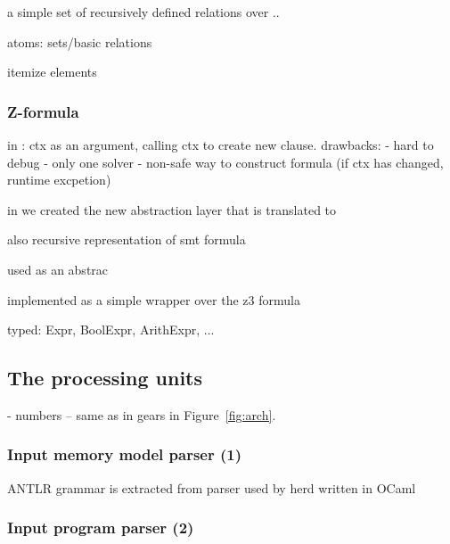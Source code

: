 a simple set of recursively defined relations over ..

atoms: sets/basic relations

itemize elements


\subsubsection{Z-formula}
\label{ch:impl:model:zformula}


in \porthos[1] : ctx as an argument, calling ctx to create new clause. 
drawbacks:
- hard to debug
- only one solver
- non-safe way to construct formula (if ctx has changed, runtime excpetion)

in \porthos[2] we created the new abstraction layer \zformula that is translated to 

also recursive representation of smt formula

used as an abstrac

implemented as a simple wrapper over the z3 formula

typed: Expr, BoolExpr, ArithExpr, ...


\subsection{The processing units} %
\label{ch:impl:proc}


- numbers -- same as in gears in Figure~\ref{fig:arch}.

\subsubsection{Input memory model parser (1)}
\label{ch:impl:proc:inp-mod-parser}

ANTLR grammar is extracted from parser used by herd written in OCaml

\subsubsection{Input program parser (2)}
\label{ch:impl:proc:inp-prog-parser}

